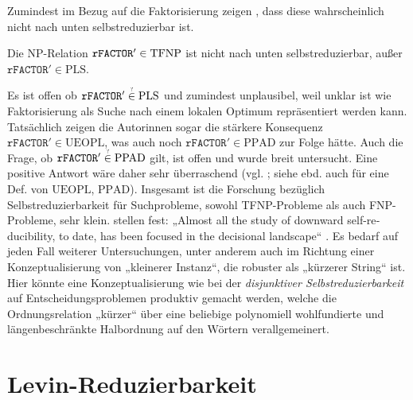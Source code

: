 Zumindest im Bezug auf die Faktorisierung zeigen \citeauthor{harsha_downward_2023}, dass diese wahrscheinlich nicht nach unten selbstreduzierbar ist.
\begin{theorem}
    Die NP-Relation $\mathtt{rFACTOR}'\in\mathrm{TFNP}$ ist nicht nach unten selbstreduzierbar, außer $\mathtt{rFACTOR}'\in\mathrm{PLS}$.
\end{theorem}
Es ist offen ob $\mathtt{rFACTOR}'\stackrel{\smash{\text{\tiny ?}}}{\in}\mathrm{PLS}$ und zumindest unplausibel, weil unklar ist wie Faktorisierung als Suche nach einem lokalen Optimum repräsentiert werden kann.
Tatsächlich zeigen die Autorinnen sogar die stärkere Konsequenz $\mathtt{rFACTOR}'\in\mathrm{UEOPL}$, was auch noch $\mathtt{rFACTOR}'\in\mathrm{PPAD}$ zur Folge hätte. Auch die Frage, ob $\mathtt{rFACTOR}'\stackrel{\smash{\text{\tiny ?}}}{\in}\mathrm{PPAD}$ gilt, ist offen und wurde breit untersucht. Eine positive Antwort wäre daher sehr überraschend (vgl. \cite[67:15]{harsha_downward_2023}; siehe ebd. auch für eine Def. von $\mathrm{UEOPL}$, $\mathrm{PPAD}$).\label{page:self-reducibility}
Insgesamt ist die Forschung bezüglich Selbstreduzierbarkeit für Suchprobleme, sowohl TFNP-Probleme als auch FNP-Probleme, sehr klein. \citeauthor{harsha_downward_2023} stellen fest: „\foreignlanguage{english}{Almost all the study of downward self-reducibility, to date, has been focused in the decisional landscape}“ \parencite*{harsha_downward_2023}. 
Es bedarf auf jeden Fall weiterer Untersuchungen, unter anderem auch im Richtung einer Konzeptualisierung von „kleinerer Instanz“, die robuster als „kürzerer String“ ist. Hier könnte eine Konzeptualisierung wie bei der \emph{disjunktiver Selbstreduzierbarkeit} auf Entscheidungsproblemen \parencites(vgl.)(){meyer_frequency_1979}{balcazar_self_1989}{selman_natural_1988}[Abschn. 9.5]{wechsung_vorlesungen_2000} produktiv gemacht werden, welche die Ordnungsrelation „kürzer“ über eine beliebige polynomiell wohlfundierte und längenbeschränkte Halbordnung auf den Wörtern verallgemeinert.

\section{Levin-Reduzierbarkeit}\label{sec:levin}

